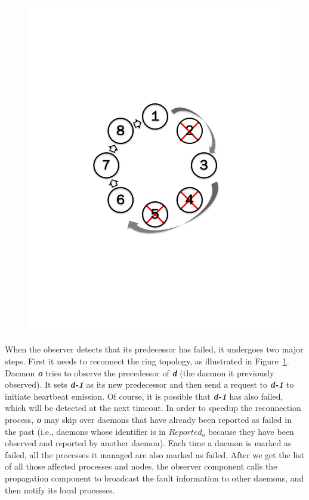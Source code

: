 \documentclass[sigconf]{acmart}
\begin{document}
\begin{figure}[h]
\begin{minipage}[t]{.22\textwidth}
  \includegraphics[trim=3cm 8.0cm 3cm 8cm,width=\linewidth]{reconnet_cross.pdf}
  \label{fig:ReconnectRing}
\end{minipage}
\end{figure}

When the observer detects that its predecessor has failed, it undergoes two major steps.
First it needs to reconnect the ring topology, as illustrated in Figure~\ref{fig:ReconnectRing}. Daemon \textbf{\textit{o}} tries to
observe the precedessor of \textbf{\textit{d}} (the daemon it previously observed).
It sets \textbf{\textit{d-1}} as its new predecessor and then send a request to \textbf{\textit{d-1}} to initiate heartbeat emission. Of course,
it is possible that \textbf{\textit{d-1}} has also failed, which will be detected at the next timeout. In order
to speedup the reconnection process, \textbf{\textit{o}} may skip over
daemons that have already been reported as failed in the past (i.e., daemons
whose identifier is in $Reported_o$ because they have been observed and reported
by another daemon). Each time a daemon is marked as failed, all the processes it
managed are also marked as failed. After we get the list of all those affected processes and nodes, the observer component calls the propagation component to broadcast the fault information to other daemons, and then notify its local processes.
\end{document}
